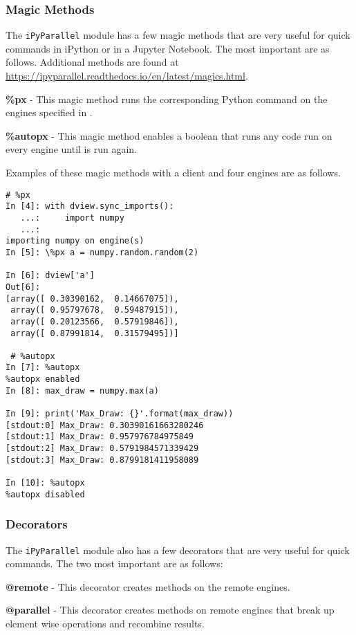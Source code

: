 \subsubsection*{Magic Methods}
The \texttt{iPyParallel} module has a few magic methods that are very useful for quick commands in iPython or in a Jupyter Notebook.
The most important are as follows.
Additional methods are found at \url{https://ipyparallel.readthedocs.io/en/latest/magics.html}.

\begin{list}{}{}
\item \textbf{\%px} - This magic method runs the corresponding Python command on the engines specified in .
\item \textbf{\%autopx} - This magic method enables a boolean that runs any code run on every engine until  is run again.
\end{list}

Examples of these magic methods with a client and four engines are as follows.

\begin{lstlisting}
# %px
In [4]: with dview.sync_imports():
   ...:     import numpy
   ...:
importing numpy on engine(s)
In [5]: \%px a = numpy.random.random(2)

In [6]: dview['a']
Out[6]:
[array([ 0.30390162,  0.14667075]),
 array([ 0.95797678,  0.59487915]),
 array([ 0.20123566,  0.57919846]),
 array([ 0.87991814,  0.31579495])]

 # %autopx
In [7]: %autopx
%autopx enabled
In [8]: max_draw = numpy.max(a)

In [9]: print('Max_Draw: {}'.format(max_draw))
[stdout:0] Max_Draw: 0.30390161663280246
[stdout:1] Max_Draw: 0.957976784975849
[stdout:2] Max_Draw: 0.5791984571339429
[stdout:3] Max_Draw: 0.8799181411958089

In [10]: %autopx
%autopx disabled
\end{lstlisting}
\subsubsection*{Decorators}
The \texttt{iPyParallel} module also has a few decorators that are very useful for quick commands.
The two most important are as follows:

\begin{list}{}{}
\item \textbf{@remote} - This decorator creates methods on the remote engines.
\item \textbf{@parallel} - This decorator creates methods on remote engines that break up element wise operations and recombine results.
\end{list}

